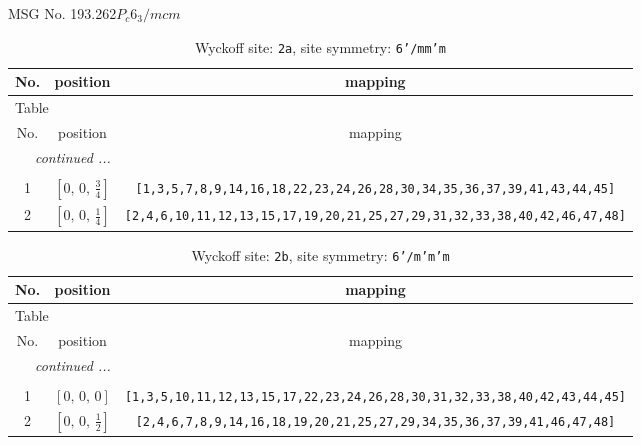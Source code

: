 \documentclass[fleqn,8pt]{jsarticle}
\begin{document}
\setcounter{MaxMatrixCols}{32}

\renewcommand{\tablename}{Table~}
\renewcommand{\figurename}{Figure~}
\begin{center}
\LARGE
MSG No. 193.262\quad$P_{c}6_{3}/mcm$
\end{center}
\renewcommand{\arraystretch}{1.2}
\begin{longtable}{ccc}
\caption{Wyckoff site: {\tt 2a}, site symmetry: {\tt 6'/mm'm}}
 \\
 \hline \hline
No. & position & mapping \\ \hline \endfirsthead

\multicolumn{2}{l}{\tablename\ \thetable{}} \\
 \hline \hline
No. & position & mapping \\ \hline \endhead

 \hline \hline
\multicolumn{2}{r}{\footnotesize\it continued ...} \\ \endfoot

 \hline \hline
\multicolumn{2}{r}{} \\ \endlastfoot

1 & $\left[ 0,\, 0,\, \frac{3}{4} \right]$ & {\tt [1,3,5,7,8,9,14,16,18,22,23,24,26,28,30,34,35,36,37,39,41,43,44,45]} \\ \hline
2 & $\left[ 0,\, 0,\, \frac{1}{4} \right]$ & {\tt [2,4,6,10,11,12,13,15,17,19,20,21,25,27,29,31,32,33,38,40,42,46,47,48]} \\
\end{longtable}
\renewcommand{\arraystretch}{1.2}
\begin{longtable}{ccc}
\caption{Wyckoff site: {\tt 2b}, site symmetry: {\tt 6'/m'm'm}}
 \\
 \hline \hline
No. & position & mapping \\ \hline \endfirsthead

\multicolumn{2}{l}{\tablename\ \thetable{}} \\
 \hline \hline
No. & position & mapping \\ \hline \endhead

 \hline \hline
\multicolumn{2}{r}{\footnotesize\it continued ...} \\ \endfoot

 \hline \hline
\multicolumn{2}{r}{} \\ \endlastfoot

1 & $\left[ 0,\, 0,\, 0 \right]$ & {\tt [1,3,5,10,11,12,13,15,17,22,23,24,26,28,30,31,32,33,38,40,42,43,44,45]} \\ \hline
2 & $\left[ 0,\, 0,\, \frac{1}{2} \right]$ & {\tt [2,4,6,7,8,9,14,16,18,19,20,21,25,27,29,34,35,36,37,39,41,46,47,48]} \\
\end{longtable}
\end{document}
